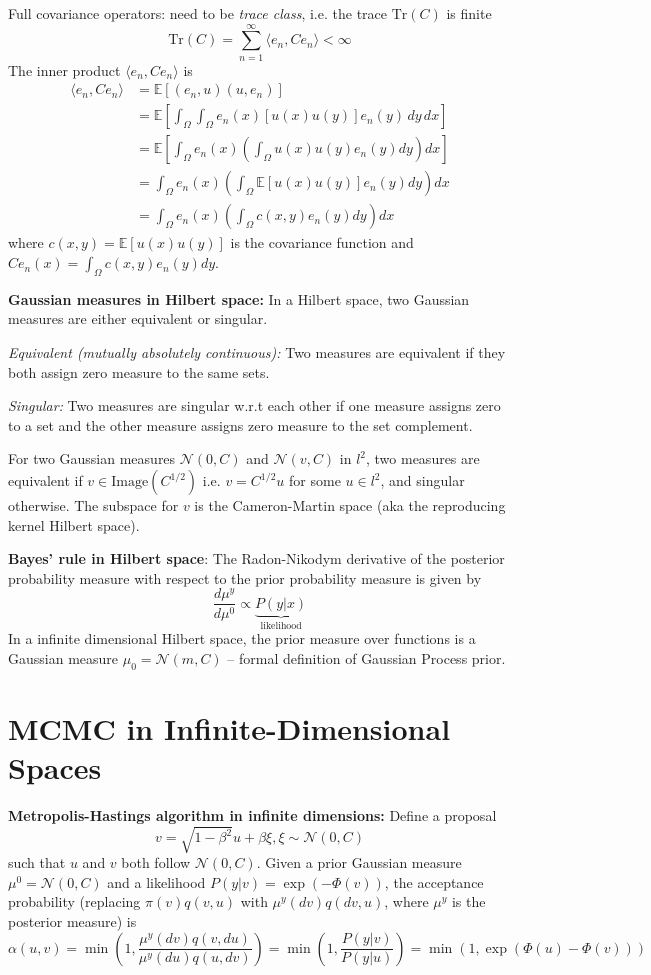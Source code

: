 \documentclass[12pt]{article}
\begin{document}
Full covariance operators: need to be \textit{trace class}, i.e. the trace $\text{Tr}(C)$ is finite
$$\text{Tr}(C) = \sum_{n=1}^\infty \langle e_n, C e_n \rangle < \infty$$
The inner product $\langle e_n, C e_n \rangle$ is
\begin{align*}
    \langle e_n, C e_n \rangle &= \mathbb{E}[(e_n, u)(u, e_n)] \\
    &= \mathbb{E}\left[\int_\Omega \int_\Omega e_n(x) [u(x)u(y)] e_n(y) \, dy \, dx\right] \\
    &= \mathbb{E}\left[\int_\Omega e_n(x) \left(\int_\Omega u(x)u(y) e_n(y) dy\right) dx\right] \\
    &= \int_\Omega e_n(x) \left(\int_\Omega \mathbb{E}[u(x)u(y)] e_n(y) dy\right) dx \\
    &= \int_\Omega e_n(x) \left(\int_\Omega c(x,y) e_n(y) dy\right) dx
\end{align*}
where $c(x,y) = \mathbb{E}[u(x)u(y)]$ is the covariance function and $C e_n(x) = \int_\Omega c(x,y) e_n(y) dy$.

\textbf{Gaussian measures in Hilbert space:} In a Hilbert space, two Gaussian measures are either equivalent or singular.

\textit{Equivalent (mutually absolutely continuous):} Two measures are equivalent if they both assign zero measure to the same sets.

\textit{Singular:} Two measures are singular w.r.t each other if one measure assigns zero to a set and the other measure assigns zero measure to the set complement.

For two Gaussian measures $\mathcal{N}(0, C)$ and $\mathcal{N}(v, C)$ in $l^2$, two measures are equivalent if $v \in \text{Image}(C^{1/2})$ i.e. $v = C^{1/2} u$ for some $u \in l^2$, and singular otherwise. The subspace for $v$ is the Cameron-Martin space (aka the reproducing kernel Hilbert space).

\textbf{Bayes' rule in Hilbert space}: The Radon-Nikodym derivative of the posterior probability measure with respect to the prior probability measure is given by
$$
\frac{d\mu^y}{d\mu^0} \propto \underbrace{P(y|x)}_{\text{likelihood}}
$$
In a infinite dimensional Hilbert space, the prior measure over functions is a Gaussian measure $\mu_0 = \mathcal{N}(m, C)$ -- formal definition of Gaussian Process prior.

\section{MCMC in Infinite-Dimensional Spaces}
\textbf{Metropolis-Hastings algorithm in infinite dimensions:} Define a proposal $$v = \sqrt{1-\beta^2} u + \beta\xi, \xi \sim \mathcal{N}(0, C)$$ such that $u$ and $v$ both follow $\mathcal{N}(0, C)$. 
Given a prior Gaussian measure $\mu^0 = \mathcal{N}(0, C)$ and a likelihood $P(y|v) = \exp(- \Phi(v))$,
the acceptance probability (replacing $\pi(v)q(v, u)$ with $\mu^y(dv)q(dv, u)$, where $\mu^y$ is the posterior measure) is 
$$\alpha(u,v) = \min\left(1, \frac{\mu^y(dv)q(v, du)}{\mu^y(du)q(u, dv)}\right) = \min\left(1, \frac{P(y|v)}{P(y|u)}\right) = \min\left(1, \exp(\Phi(u) - \Phi(v))\right)$$
\end{document}
